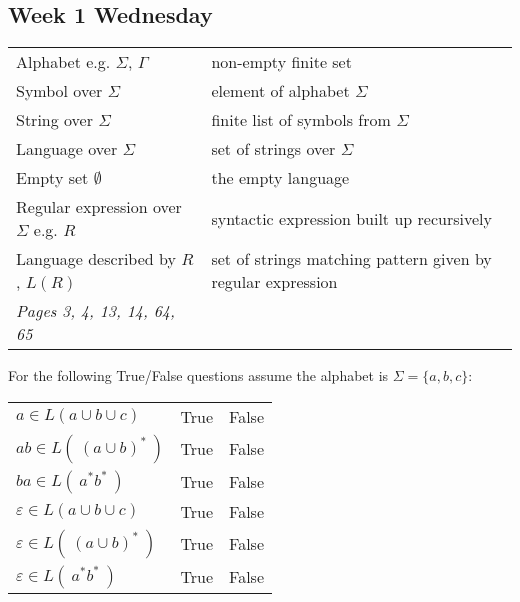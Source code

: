 \newpage
\subsection*{Week 1 Wednesday}

\begin{center}
    \begin{tabular}{|ll|}
    \hline
    Alphabet e.g. $\Sigma$, $\Gamma$ & 	non-empty finite set	 \\
    Symbol over $\Sigma$  & element of alphabet $\Sigma$\\
    String over $\Sigma$  &	finite list of symbols from $\Sigma$\\
    Language over $\Sigma$& set of strings over $\Sigma$ \\
    Empty set $\emptyset$ & the empty language\\
    Regular expression over $\Sigma$ e.g. $R$& syntactic expression built up recursively \\
    Language described by $R$,  $L(R)$ & set of strings matching pattern given by 
    regular expression\\
    \hline
    {\it Pages 3, 4, 13, 14, 64, 65}& \\
    \hline
    \end{tabular}
    \end{center}
    
    
    For the following True/False questions assume the alphabet is $\Sigma =  \{a,b,c\}$:
    
    \begin{center}
    \begin{tabular}{lcc}
    $a  \in L(a \cup b \cup c)$ & True & False \\
    $ab  \in L(~ (a \cup b)^*  ~)$ & True & False \\
    $ba \in L( ~ a^* b^* ~)$ & True & False \\
    $\varepsilon  \in L(a \cup b \cup c)$ & True & False \\
    $\varepsilon  \in L(~ (a \cup b)^*  ~)$ & True & False \\
    $\varepsilon \in L( ~ a^* b^* ~)$ & True & False \\
    \end{tabular}
    \end{center}
    
    
    
